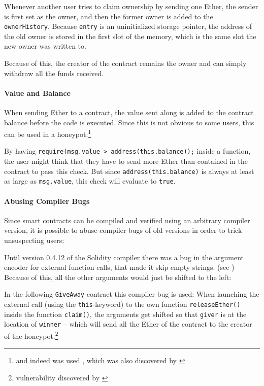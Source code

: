 Whenever another user tries to claim ownership by sending one Ether, the sender is first set as the owner, and then the former owner is added to the \texttt{ownerHistory}. Because \texttt{entry} is an uninitialized storage pointer, the address of the old owner is stored in the first slot of the memory, which is the same slot the new owner was written to.

Because of this, the creator of the contract remains the owner and can simply withdraw all the funds received.

\paragraph{Value and Balance}
When sending Ether to a contract, the value sent along is added to the contract balance before the code is executed. Since this is not obvious to some users, this can be used in a honeypot:\footnote{and indeed was used \cite{etherscan:multiplicatorx3}, which was also discovered by \cite{wagner:honeypots}}

By having \texttt{require(msg.value > address(this.balance));} inside a function, the user might think that they have to send more Ether than contained in the contract to pass this check. But since \texttt{address(this.balance)} is always at least as large as \texttt{msg.value}, this check will evaluate to \texttt{true}.

\paragraph{Abusing Compiler Bugs}
Since smart contracts can be compiled and verified using an arbitrary compiler version, it is possible to abuse compiler bugs of old versions in order to trick unsuspecting users:

Until version 0.4.12 of the Solidity compiler there was a bug in the argument encoder for external function calls, that made it skip empty strings. (see \cite[SkipEmptyStringLiteral]{solidity:buglist}) Because of this, all the other arguments would just be shifted to the left:

In the following \texttt{GiveAway}-contract this compiler bug is used: When launching the external call (using the \texttt{this}-keyword) to the own function \texttt{releaseEther()} inside the function \texttt{claim()}, the arguments get shifted so that \texttt{giver} is at the location of \texttt{winner} -- which will send all the Ether of the contract to the creator of the honeypot.\footnote{vulnerability discovered by \cite{reddit:honeypots}}

